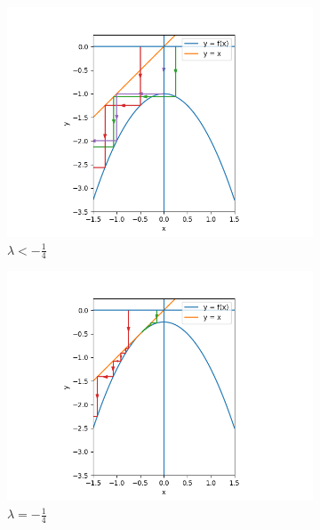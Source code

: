 \documentclass[nonumber]{homework}
\begin{document}
	
	\begin{figure}[h]
		\begin{subfigure}{.33\textwidth}
			\centering
			\includegraphics[width=\linewidth]{3.4c lambda lt -14.png}
			\caption{$\lambda < -\frac{1}{4}$}
			\label{fig:3.4clt-14}
		\end{subfigure}
		\begin{subfigure}{.33\textwidth}
			\centering
			\includegraphics[width=\linewidth]{3.4c lambda eq -14.png}
			\caption{$\lambda = -\frac{1}{4}$}
			\label{fig:3.4ceq-14}
		\end{subfigure}
		\begin{subfigure}{.33\textwidth}
			\centering

\end{subfigure}
\end{figure}
\end{document}
